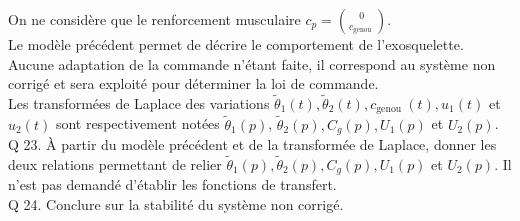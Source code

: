 \documentclass[10pt]{article}
\begin{document}
On ne considère que le renforcement musculaire $c_{p}=\binom{0}{c_{\text {genou }}}$.\\
Le modèle précédent permet de décrire le comportement de l'exosquelette. Aucune adaptation de la commande n'étant faite, il correspond au système non corrigé et sera exploité pour déterminer la loi de commande.\\
Les transformées de Laplace des variations $\tilde{\theta}_{1}(t), \tilde{\theta}_{2}(t), c_{\text {genou }}(t), u_{1}(t)$ et $u_{2}(t)$ sont respectivement notées $\tilde{\theta}_{1}(p)$, $\tilde{\theta}_{2}(p), C_{g}(p), U_{1}(p)$ et $U_{2}(p)$.\\
Q 23. À partir du modèle précédent et de la transformée de Laplace, donner les deux relations permettant de relier $\tilde{\theta}_{1}(p), \tilde{\theta}_{2}(p), C_{g}(p), U_{1}(p)$ et $U_{2}(p)$. Il n'est pas demandé d'établir les fonctions de transfert.\\
Q 24. Conclure sur la stabilité du système non corrigé.
\end{document}
